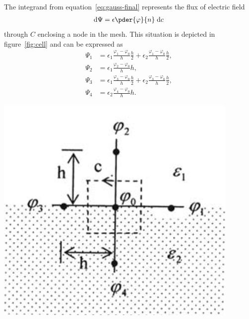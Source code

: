 \documentclass[11pt,a4paper]{article}
\begin{document}
\noindent%
\begin{minipage}{.6\textwidth}
    The integrand from equation~\ref{eq:gauss-final} represents the flux of electric field
    \begin{align*}
        \mathrm d \Psi = \epsilon \pder{\varphi}{n} \; \mathrm d c
    \end{align*}
    through $C$ enclosing a node in the mesh. This situation is depicted in figure~\ref{fig:cell} and can be expressed as
    \begin{align*}
        \Psi_1 &= \epsilon_1 \frac{\varphi_1-\varphi_0}{h} \frac h2 + \epsilon_2 \frac{\varphi_1-\varphi_0}{h} \frac h2,
    \\
        \Psi_2 &= \epsilon_1 \frac{\varphi_2-\varphi_0}{h} h,
    \\
        \Psi_3 &= \epsilon_1 \frac{\varphi_3-\varphi_0}{h} \frac h2 + \epsilon_2 \frac{\varphi_3-\varphi_0}{h} \frac h2,
    \\
        \Psi_4 &= \epsilon_2 \frac{\varphi_4-\varphi_0}{h} h.
    \end{align*}
\end{minipage}\hfill\begin{minipage}{.35\textwidth}
    \centering
    \captionsetup{type=figure}
    \includegraphics[width=\textwidth]{src/cell.png}
    \label{fig:cell}
\end{minipage}
\end{document}
